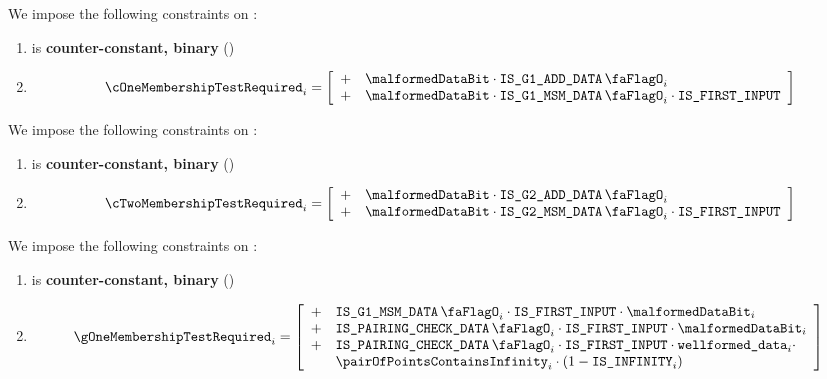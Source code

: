 
We impose the following constraints on \cOneMembershipTestRequired{}:
\begin{enumerate}
    \item \cOneMembershipTestRequired{} is \textbf{counter-constant, binary} \quad (\trash)
    \item
        \[  
            \cOneMembershipTestRequired_{i} = 
            \left[ \begin{array}{clcr}
              + & \malformedDataBit \cdot \isBlsGOneAddData_{i} \\
              + & \malformedDataBit \cdot \isBlsGOneMsmData_{i} \cdot \isFirstInput \\
            \end{array} \right] \vspace{2mm}  
        \]
\end{enumerate}
\noindent
We impose the following constraints on \cTwoMembershipTestRequired{}:
\begin{enumerate}
    \item \cTwoMembershipTestRequired{} is \textbf{counter-constant, binary} \quad (\trash)
    \item 
    \[  
        \cTwoMembershipTestRequired_{i} = 
        \left[ \begin{array}{clcr}
          + & \malformedDataBit \cdot \isBlsGTwoAddData_{i} \\
          + & \malformedDataBit \cdot \isBlsGTwoMsmData_{i} \cdot \isFirstInput \\
        \end{array} \right] \vspace{2mm}  
    \]
\end{enumerate}
\noindent
We impose the following constraints on \gOneMembershipTestRequired{}:
\begin{enumerate}
    \item \gOneMembershipTestRequired{} is \textbf{counter-constant, binary} \quad (\trash)
    \item 
        \[
            \gOneMembershipTestRequired_{i} = 
                \left[ \begin{array}{cl} 
                    + & \isBlsGOneMsmData_{i} \cdot \isFirstInput \cdot \malformedDataBit_{i}  \\
                    + & \isBlsPairingCheckData_{i} \cdot \isFirstInput \cdot \malformedDataBit_{i} \\
                    + & \isBlsPairingCheckData_{i} \cdot \isFirstInput \cdot \locWellformedData_{i} \cdot \\
                      & \pairOfPointsContainsInfinity_{i} \cdot (1 - \isInfinity_{i}) \\
                \end{array} \right] \\
        \]
\end{enumerate}
